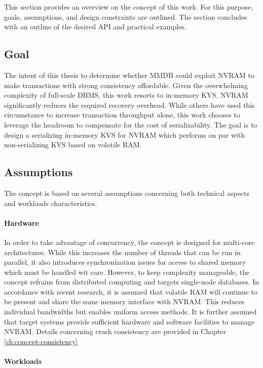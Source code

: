 This section provides an overview on the concept of this work. For this purpose,
goals, assumptions, and design constraints are outlined. The section concludes
with an outline of the desired API and practical examples.

\subsection{Goal}

The intent of this thesis to determine whether MMDB could exploit NVRAM to make
transactions with strong consistency affordable. Given the overwhelming
complexity of full-scale DBMS, this work resorts to in-memory KVS. NVRAM
significantly reduces the required recovery overhead. While others have used
this circumstance to increase transaction throughput alone, this work chooses to
leverage the headroom to compensate for the cost of serializability. The goal is
to design a serializing in-memory KVS for NVRAM which performs on par with
non-serializing KVS based on volatile RAM.

\subsection{Assumptions}

The concept is based on several assumptions concerning both technical aspects
and workloads characteristics.

\paragraph{Hardware}

In order to take advantage of concurrency, the concept is designed for
multi-core architectures. While this increases the number of threads that can be
run in parallel, it also introduces synchronization issues for access to shared
memory which must be handled wit care. However, to keep complexity manageable,
the concept refrains from distributed computing and targets single-node
databases. In accordance with recent research, it is assumed that volatile RAM
will continue to be present and share the same memory interface with NVRAM. This
reduces individual bandwidths but enables uniform access methods. It is further
assumed that target systems provide sufficient hardware and software facilities
to manage NVRAM. Details concerning crash consistency are provided in Chapter
\ref{ch:concept-consistency}

\paragraph{Workloads}

